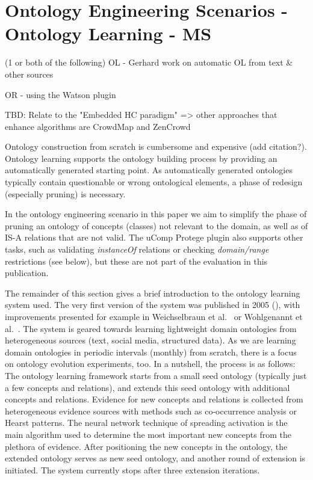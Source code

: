 \section{Ontology Engineering Scenarios - Ontology Learning - MS}
 (1 or both of the following)
OL - Gerhard work on automatic OL from text \& other sources

OR - using the Watson plugin

TBD: Relate to the "Embedded HC paradigm" => other approaches that enhance algorithms are CrowdMap and ZenCrowd


Ontology construction from scratch is cumbersome and expensive (add citation?). Ontology learning supports the ontology
building process by providing an automatically generated starting point. As automatically generated ontologies
typically contain questionable or wrong ontological elements, a phase of redesign (especially pruning) is necessary.

In the ontology engineering scenario in this paper we aim to simplify the phase of pruning an ontology of concepts (classes)
not relevant to the domain, as well as of IS-A relations that are not valid. The uComp Protege plugin also supports other
tasks, such as validating \emph{instanceOf} relations or checking \emph{domain/range} restrictions (see below), 
but these are not part of the evaluation in this publication.

The remainder of this section gives a brief introduction to the ontology learning system used.
The very first version of the system was published in 2005 (\cite{liu2005}), with improvements presented for example
in Weichselbraun et al.~\cite{weichselbraun2010dke} or Wohlgenannt et al.~\cite{wohlgenannt2012}. 
The system is geared towards learning lightweight domain ontologies from heterogeneous sources 
(text, social media, structured data). As we are learning domain ontologies in periodic intervals (monthly) from scratch, 
there is a focus on ontology evolution experiments, too.
In a nutshell, the process is as follows: The ontology learning framework starts from a small seed ontology 
(typically just a few concepts and relations), and extends this seed ontology with additional concepts and relations. 
Evidence for new concepts and relations is collected from heterogeneous evidence sources 
with methods such as co-occurrence analysis or Hearst patterns.
The neural network technique of spreading activation is the main algorithm used to determine the most important new concepts
from the plethora of evidence. After positioning the new concepts in the ontology, the extended ontology serves as
new seed ontology, and another round of extension is initiated. The system currently stops after three extension iterations.

